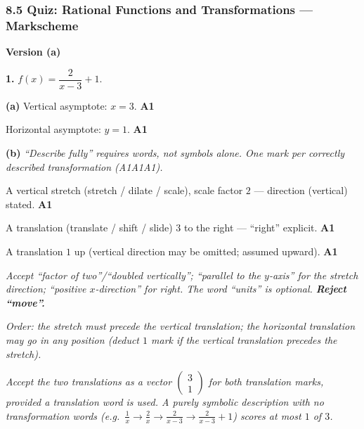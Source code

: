 \documentclass[12pt, twoside]{article}
\begin{document}
\subsubsection*{8.5 Quiz: Rational Functions and Transformations --- Markscheme}

\medskip

\noindent\textbf{\large Version (a)}

\bigskip

\noindent\textbf{1.} $\displaystyle f(x)=\dfrac{2}{x-3}+1$.

\medskip

\textbf{(a)} Vertical asymptote: $x=3$. \hfill \textbf{A1}

Horizontal asymptote: $y=1$. \hfill \textbf{A1}

\medskip

\textbf{(b)} \emph{``Describe fully'' requires words, not symbols alone. One mark
per correctly described transformation (A1A1A1).}

A vertical stretch (stretch / dilate / scale), scale factor $2$ --- direction (vertical) stated. \hfill \textbf{A1}

A translation (translate / shift / slide) $3$ to the right --- ``right'' explicit. \hfill \textbf{A1}

A translation $1$ up (vertical direction may be omitted; assumed upward). \hfill \textbf{A1}

\emph{Accept ``factor of two''/``doubled vertically''; ``parallel to the $y$-axis''
for the stretch direction; ``positive $x$-direction'' for right. The word
``units'' is optional. \textbf{Reject ``move''.}}

\emph{Order: the stretch must precede the vertical translation; the horizontal
translation may go in any position (deduct $1$ mark if the vertical translation
precedes the stretch).}

\emph{Accept the two translations as a vector
$\left(\begin{smallmatrix}3\\1\end{smallmatrix}\right)$ for both translation marks,
provided a translation word is used. A purely symbolic description with no
transformation words (e.g.\ $\tfrac1x\to\tfrac2x\to\tfrac{2}{x-3}\to\tfrac{2}{x-3}+1$)
scores at most $1$ of $3$.}

\medskip
\end{document}
